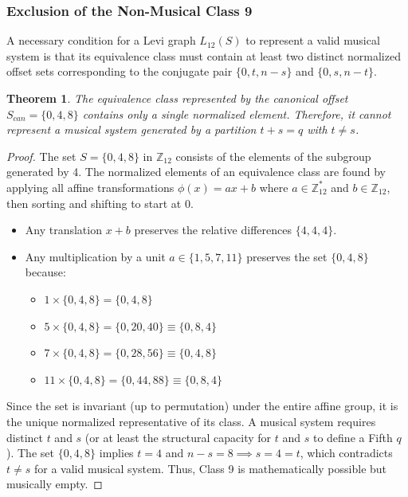 \documentclass[12pt,letterpaper]{amsart}
\newtheorem{theorem}{Theorem}
\begin{document}
\subsubsection{Exclusion of the Non-Musical Class 9}

A necessary condition for a Levi graph $L_{12}(S)$ to represent a valid musical system is that its equivalence class must contain at least two distinct normalized offset sets corresponding to the conjugate pair $\{0, t, n-s\}$ and $\{0, s, n-t\}$.

\begin{theorem}
The equivalence class represented by the canonical offset $S_{can} = \{0, 4, 8\}$ contains only a single normalized element. Therefore, it cannot represent a musical system generated by a partition $t+s=q$ with $t \neq s$.
\end{theorem}

\begin{proof}
The set $S = \{0, 4, 8\}$ in $\mathbb{Z}_{12}$ consists of the elements of the subgroup generated by 4.
The normalized elements of an equivalence class are found by applying all affine transformations $\phi(x) = ax+b$ where $a \in \mathbb{Z}_{12}^*$ and $b \in \mathbb{Z}_{12}$, then sorting and shifting to start at 0.
\begin{itemize}
    \item Any translation $x+b$ preserves the relative differences $\{4, 4, 4\}$.
    \item Any multiplication by a unit $a \in \{1, 5, 7, 11\}$ preserves the set $\{0, 4, 8\}$ because:
    \begin{itemize}
        \item $1 \times \{0,4,8\} = \{0,4,8\}$
        \item $5 \times \{0,4,8\} = \{0, 20, 40\} \equiv \{0, 8, 4\}$
        \item $7 \times \{0,4,8\} = \{0, 28, 56\} \equiv \{0, 4, 8\}$
        \item $11 \times \{0,4,8\} = \{0, 44, 88\} \equiv \{0, 8, 4\}$
    \end{itemize}
\end{itemize}
Since the set is invariant (up to permutation) under the entire affine group, it is the unique normalized representative of its class. A musical system requires distinct $t$ and $s$ (or at least the structural capacity for $t$ and $s$ to define a Fifth $q$). The set $\{0, 4, 8\}$ implies $t=4$ and $n-s=8 \implies s=4=t$, which contradicts $t\neq s$ for a valid musical system. Thus, Class 9 is mathematically possible but musically empty.
\end{proof}
\end{document}
